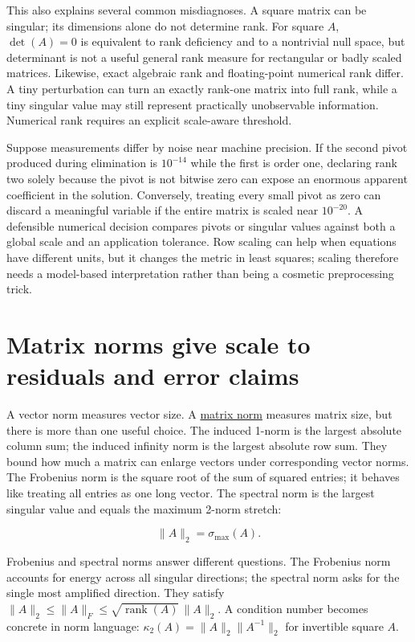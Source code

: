 This also explains several common misdiagnoses. A square matrix can be singular; its dimensions alone do not determine rank. For square \(A\), \(\det(A)=0\) is equivalent to rank deficiency and to a nontrivial null space, but determinant is not a useful general rank measure for rectangular or badly scaled matrices. Likewise, exact algebraic rank and floating-point numerical rank differ. A tiny perturbation can turn an exactly rank-one matrix into full rank, while a tiny singular value may still represent practically unobservable information. Numerical rank requires an explicit scale-aware threshold.

Suppose measurements differ by noise near machine precision. If the second pivot produced during elimination is \(10^{-14}\) while the first is order one, declaring rank two solely because the pivot is not bitwise zero can expose an enormous apparent coefficient in the solution. Conversely, treating every small pivot as zero can discard a meaningful variable if the entire matrix is scaled near \(10^{-20}\). A defensible numerical decision compares pivots or singular values against both a global scale and an application tolerance. Row scaling can help when equations have different units, but it changes the metric in least squares; scaling therefore needs a model-based interpretation rather than being a cosmetic preprocessing trick.

\section{Matrix norms give scale to residuals and error claims}\label{01-foundations-i-ch019-matrix-norms-give-scale-to-residuals-and-error-claims}

A vector norm measures vector size. A \hyperref[01-foundations-i-ch019-matrix-norms-put-scale-into-error-statements]{matrix norm} measures matrix size, but there is more than one useful choice. The induced 1-norm is the largest absolute column sum; the induced infinity norm is the largest absolute row sum. They bound how much a matrix can enlarge vectors under corresponding vector norms. The Frobenius norm is the square root of the sum of squared entries; it behaves like treating all entries as one long vector. The spectral norm is the largest singular value and equals the maximum 2-norm stretch:

\[
\|A\|_2=\sigma_{\max}(A).
\]

Frobenius and spectral norms answer different questions. The Frobenius norm accounts for energy across all singular directions; the spectral norm asks for the single most amplified direction. They satisfy \(\|A\|_2\le\|A\|_F\le\sqrt{\operatorname{rank}(A)}\,\|A\|_2\). A condition number becomes concrete in norm language: \(\kappa_2(A)=\|A\|_2\|A^{-1}\|_2\) for invertible square \(A\).

